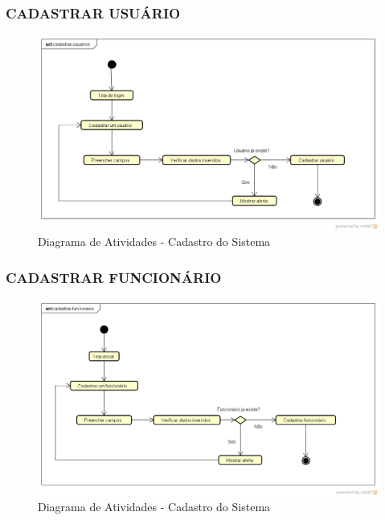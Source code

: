 \subsubsection{CADASTRAR USUÁRIO}
\begin{figure}[htb]
	\caption{\label{fig_cadastro} Diagrama de Atividades - Cadastro do Sistema}
	\begin{center}
	    \includegraphics[width=0.7\linewidth]{imagens/usuarios.png}
	\end{center}
\end{figure}

\newpage

\subsubsection{CADASTRAR FUNCIONÁRIO}
\begin{figure}[htb]
	\caption{\label{fig_cadastro} Diagrama de Atividades - Cadastro do Sistema}
	\begin{center}
	    \includegraphics[width=0.8\linewidth]{imagens/funcionario.png}
	\end{center}
\end{figure}

